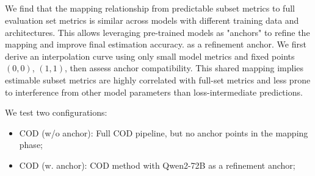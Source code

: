\subsection{}
\label{sec:anchor}
We find that the mapping relationship from predictable subset metrics to full evaluation set metrics is similar across models with different training data and architectures. This allows leveraging pre-trained models as "anchors" to refine the mapping and improve final estimation accuracy.  as a refinement anchor. 
We first derive an interpolation curve using only small model metrics and fixed points $(0,0)$, $(1,1)$, then assess anchor compatibility. This shared mapping implies estimable subset metrics are highly correlated with full-set metrics and less prone to interference from other model parameters than loss-intermediate predictions.

We test two configurations:
\begin{itemize}[leftmargin=1.5em]
\item COD (w/o anchor): Full COD pipeline, but no anchor points in the mapping phase;
\item COD (w. anchor): COD method with Qwen2-72B as a refinement anchor;
\end{itemize}

